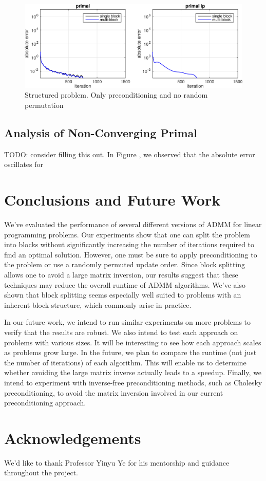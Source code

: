 \documentclass{article}
\begin{document}
\begin{figure}[h]
	\includegraphics[width=\textwidth]{../figures/struct_precond_norndperm.png}
	\caption{Structured problem. Only preconditioning and  no random permutation}
	\label{fig:struct_p_nor}
\end{figure}

\subsection*{Analysis of Non-Converging Primal}
{\color{red} TODO: consider filling this out.}
In Figure \label{fig:nop_nor}, we observed that the absolute error oscillates for \

\vspace{0.5in}
\section{Conclusions and Future Work}

We've evaluated the performance of several different versions of ADMM for linear programming problems. Our experiments show that one can split the problem into blocks without significantly increasing the number of iterations required to find an optimal solution. However, one must be sure to apply preconditioning to the problem or use a randomly permuted update order. Since block splitting allows one to avoid a large matrix inversion, our results suggest that these techniques may reduce the overall runtime of ADMM algorithms. We've also shown that block splitting seems especially well suited to problems with an inherent block structure, which commonly arise in practice.

In our future work, we intend to run similar experiments on more problems to verify that the results are robust. We also intend to test each approach on problems with various sizes. It will be interesting to see how each approach scales as problems grow large. In the future, we plan to compare the runtime (not just the number of iterations) of each algorithm. This will enable us to determine whether avoiding the large matrix inverse actually leads to a speedup. Finally, we intend to experiment with inverse-free preconditioning methods, such as Cholesky preconditioning, to avoid the matrix inversion involved in our current preconditioning approach.

\vspace{0.5in}
\section{Acknowledgements}

We'd like to thank Professor Yinyu Ye for his mentorship and guidance throughout the project. 

\newpage
\vspace{0.4in}
%

\end{document}
